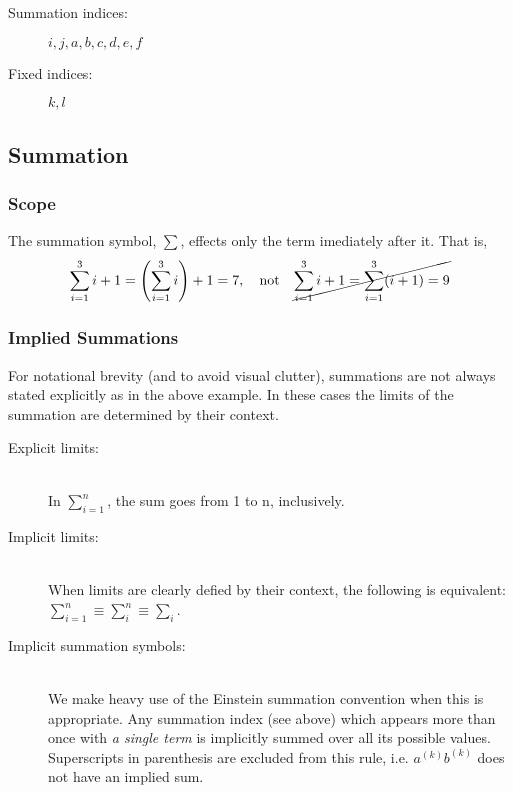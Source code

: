 \documentclass[Thesis.tex]{subfiles}
\begin{document}
\begin{description}
\item[Summation indices:] $i, j, a, b, c, d, e, f$
\item[Fixed indices:] $k, l$
\end{description}

\subsection{Summation}

\subsubsection{Scope}

The summation symbol, $\sum$, effects only the term imediately after it. That
is,
\begin{align}
  \sum_{i=1}^3 i + 1 = \qty(\sum_{i=1}^3 i) + 1 = 7, \qq{not} \cancel{\sum_{i=1}^3i + 1 = \sum_{i=1}^3(i + 1) = 9}
\end{align}

\subsubsection{Implied Summations}

For notational brevity (and to avoid visual clutter), summations are not always
stated explicitly as in the above example. In these cases the limits of the
summation are determined by their context.

\begin{description}
\item[Explicit limits:] \hfill\\
  In $\sum_{i=1}^n$, the sum goes from 1 to n, inclusively.
\item[Implicit limits:]\hfill\\
  When limits are clearly defied by their context, the following is equivalent:
  $\sum_{i=1}^n \equiv \sum_{i}^n\equiv \sum_i$.
\item[Implicit summation symbols:]\hfill\\
  We make heavy use of the Einstein summation convention when this is
  appropriate. Any summation index (see above) which appears more than once with
  \emph{a single term} is implicitly summed over all its possible values.
  Superscripts in parenthesis are excluded from this rule, i.e. $a^{(k)}b^{(k)}$
  does not have an implied sum.
\end{description}
\end{document}
